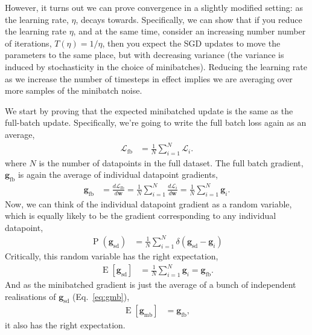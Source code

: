 \documentclass{article}
\newcommand{\dt}[2][]{\frac{d #1}{d #2}}
\newcommand{\dLi}{\dt[{\Li}]}
\newcommand{\dLfb}{\dt[{\Lfb}]}
\newcommand{\bracket}[3]{\left#1 #3 \right#2}
\newcommand{\sqb}{\bracket{[}{]}}
\renewcommand{\b}{\bracket{(}{)}}
\newcommand{\0}{\mathbf{0}}
\newcommand{\g}{\mathbf{g}}
\newcommand{\gfb}{\g_\text{fb}}
\newcommand{\gmb}{\g_\text{mb}}
\newcommand{\gsd}{\g_\text{sd}}
\renewcommand{\P}{\operatorname{P}\b}
\newcommand{\w}{\mathbf{w}}
\renewcommand{\L}{\mathcal{L}}
\newcommand{\Li}{\L_i}
\newcommand{\Lfb}{\L_\text{fb}}
\newcommand{\E}{\operatorname{E}\sqb}
\newcommand{\fbsize}{N}
\newcommand{\fbavg}{\tfrac{1}{\fbsize} \sum_{i=1}^{\fbsize}}
\begin{document}
However, it turns out we can prove convergence in a slightly modified setting: as the learning rate, $\eta$, decays towards.
Specifically, we can show that if you reduce the learning rate $\eta$, and at the same time, consider an increasing number number of iterations, $T(\eta) = 1/\eta$, then you expect the SGD updates to move the parameters to the same place, but with decreasing variance (the variance is induced by stochasticity in the choice of minibatches). 
Reducing the learning rate as we increase the number of timesteps in effect implies we are averaging over more samples of the minibatch noise.

We start by proving that the expected minibatched update is the same as the full-batch update.
Specifically, we're going to write the full batch loss again as an average,
\begin{align}
  \Lfb &= \fbavg \Li.
\end{align}
where $N$ is the number of datapoints in the full dataset.
The full batch gradient, $\gfb$ is again the average of individual datapoint gradients,
\begin{align}
  \gfb &= \dLfb{\w} = \fbavg \dLi{\w} = \fbavg \g_i.
\end{align}
Now, we can think of the individual datapoint gradient as a random variable, which is equally likely to be the gradient corresponding to any individual datapoint,
\begin{align}
  \P{\gsd} &= \fbavg \delta(\gsd - \g_i)
\end{align}
Critically, this random variable has the right expectation,
\begin{align}
  \E{\gsd} &= \fbavg \g_i = \gfb.
\end{align}
And as the minibatched gradient is just the average of a bunch of independent realisations of $\gsd$ (Eq.~\ref{eq:gmb}),
\begin{align}
  \E{\gmb} &= \gfb,
\end{align}
it also has the right expectation.
\end{document}
